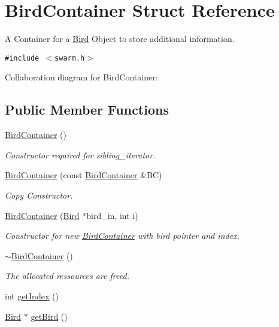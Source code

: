 \hypertarget{structBirdContainer}{
\section{BirdContainer Struct Reference}
\label{structBirdContainer}
}
A Container for a \hyperlink{classBird}{Bird} Object to store additional information.  


{\tt \#include $<$swarm.h$>$}

Collaboration diagram for BirdContainer:\subsection*{Public Member Functions}
\begin{CompactItemize}
\item 
\hyperlink{structBirdContainer_9e8cbdab41d0be4a47c394a1ccbcb58c}{BirdContainer} ()
\begin{CompactList}\small\item\em Constructor required for sibling\_\-iterator. \item\end{CompactList}\item 
\hyperlink{structBirdContainer_185db0ded7a97b6a4747b0f44664dafc}{BirdContainer} (const \hyperlink{structBirdContainer}{BirdContainer} \&BC)
\begin{CompactList}\small\item\em Copy Constructor. \item\end{CompactList}\item 
\hyperlink{structBirdContainer_963cb7c76ed9fc03dfcd097c0f67e112}{BirdContainer} (\hyperlink{classBird}{Bird} $\ast$bird\_\-in, int i)
\begin{CompactList}\small\item\em Constructor for new \hyperlink{structBirdContainer}{BirdContainer} with bird pointer and index. \item\end{CompactList}\item 
\hyperlink{structBirdContainer_49cffc821a946e263b1227d70f79b4e0}{$\sim$BirdContainer} ()
\begin{CompactList}\small\item\em The allocated ressources are freed. \item\end{CompactList}\item 
int \hyperlink{structBirdContainer_b3d7a5dc1ee60589def9bac243b8c33f}{getIndex} ()
\item 
\hyperlink{classBird}{Bird} $\ast$ \hyperlink{structBirdContainer_ae0fbf2b634f5f92c4b80c6f89727318}{getBird} ()
\end{CompactItemize}
